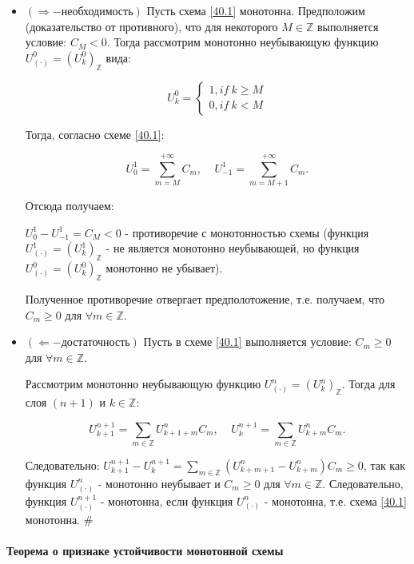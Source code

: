 \documentclass[__main__.tex]{subfiles}
\begin{document}
\begin{itemize}
	\item $\left( \Rightarrow - \text{необходимость} \right)$
	Пусть схема \ref{40.1} монотонна. Предположим (доказательство от противного), что для некоторого $M \in \mathbb{Z}$ выполняется условие: $C_M < 0$. Тогда рассмотрим монотонно неубывающую функцию $U^0_{\left(\cdot\right)} = \left(U^0_k\right)_{\mathbb{Z}}$ вида:
	
	$$
	U^0_k = 
	\begin{cases}
	1, if \ k \geq M \\
	0, if \ k < M
	\end{cases}
	$$
	
	Тогда, согласно схеме \ref{40.1}:
	
	$$
	U^1_0 = \sum_{m = M}^{+\infty} C_m, \ \ \ \ \
	U^1_{-1} = \sum_{m = M+1}^{+\infty} C_m.
	$$
	
	Отсюда получаем:
	
	$U^1_0 - U^1_{-1} = C_M < 0$ - противоречие с монотонностью схемы (функция $U^1_{\left(\cdot\right)} = \left(U^1_k\right)_{\mathbb{Z}}$ - не является монотонно неубывающей, но функция $U^0_{\left(\cdot\right)} = \left(U^0_k\right)_{\mathbb{Z}}$ монотонно не убывает).
	
	Полученное противоречие отвергает предполотожение, т.е. получаем, что $C_m \geq 0$ для $\forall m \in \mathbb{Z}$.
	
	\item $\left( \Leftarrow - \text{достаточность} \right)$
	Пусть в схеме \ref{40.1} выполняется условие: $C_m \geq 0$ для $\forall m \in \mathbb{Z}$.
	
	Рассмотрим монотонно неубывающую функцию $U^n_{\left(\cdot\right)} = \left(U^n_k\right)_{\mathbb{Z}}$. Тогда для слоя $\left(n+1\right)$ и $k \in \mathbb{Z}$:
	
	$$
	U^{n+1}_{k+1} = \sum_{m\in \mathbb{Z}} U^n_{k+1+m} C_m, \ \ \ \ \
	U^{n+1}_k = \sum_{m\in \mathbb{Z}} U^n_{k+m} C_m.
	$$
	
	Следовательно: $U^{n+1}_{k+1} - U^{n+1}_k = \sum_{m\in \mathbb{Z}} \left( U^n_{k+m+1} - U^n_{k+m} \right) C_m \geq 0$, так как функция $U^n_{\left(\cdot\right)}$ - монотонно неубывает и $C_m \geq 0$ для $\forall m \in \mathbb{Z}$. Следовательно, функция $U^{n+1}_{\left(\cdot\right)}$ - монотонна, если функция $U^n_{\left(\cdot\right)}$ - монотонна, т.е. схема \ref{40.1} монотонна. $\#$
\end{itemize}

\paragraph{Теорема о признаке устойчивости монотонной схемы}
\end{document}
